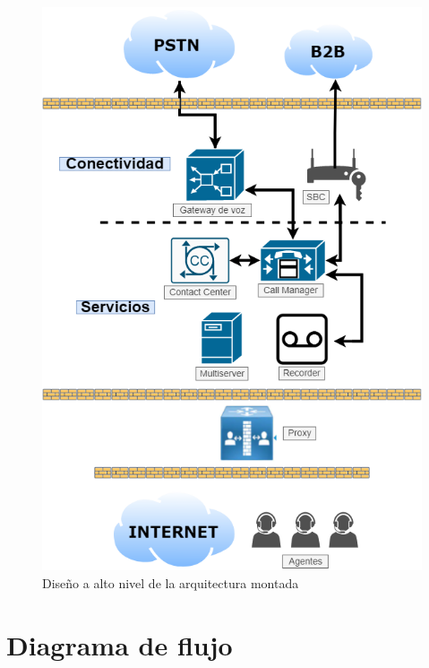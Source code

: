 \documentclass[a4paper, 12pt]{book}
\begin{document}
\begin{figure}[!]
  \centering
  \includegraphics[scale=0.6]{img/fig_arquitectura}
  \caption{Diseño a alto nivel de la arquitectura montada}
  \label{figura:fig_arquitectura}
\end{figure}

\section{Diagrama de flujo}
\label{sec:flujo}
\end{document}
